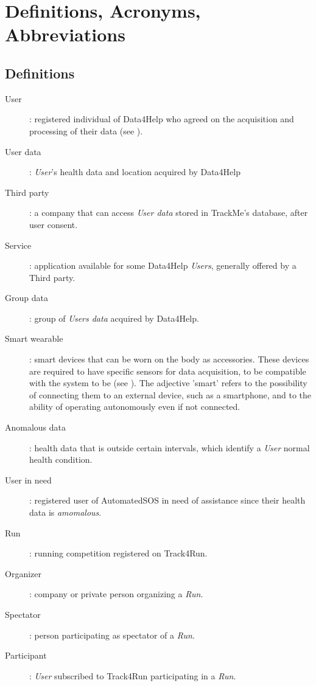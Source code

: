 \documentclass[../../rasd.tex]{subfiles}
\begin{document}
\section{Definitions, Acronyms, Abbreviations}
		\subsection{Definitions}
		\begin{description}
			\item[User]: registered individual of Data4Help who agreed on the acquisition and processing of their data (see ).
			\item[User data]: \textit{User}'s health data and location acquired by Data4Help
			\item[Third party]: a company that can access \textit{User data} stored in TrackMe's database, after user consent.
			\item[Service]: application available for some Data4Help \textit{Users}, generally offered by a Third party.
			\item[Group data]: group of \textit{Users data} acquired by Data4Help.
			\item[Smart wearable]: smart devices that can be worn on the body as accessories. These devices are required to have specific sensors for data acquisition, to be compatible with the system to be (see ). The adjective 'smart' refers to the possibility of connecting them to an external device, such as a smartphone, and to the ability of operating autonomously even if not connected.
			\item[Anomalous data]: health data that is outside certain intervals, which identify a \textit{User} normal health condition. 
			\item[User in need]: registered user of AutomatedSOS in need of assistance since their health data is \textit{amomalous}.
			\item[Run]: running competition registered on Track4Run. 
			\item[Organizer]: company or private person organizing a \textit{Run}.
			\item[Spectator]: person participating as spectator of a \textit{Run}.
			\item[Participant]: \textit{User} subscribed to Track4Run participating in a \textit{Run}.

		\end{description}
\end{document}
